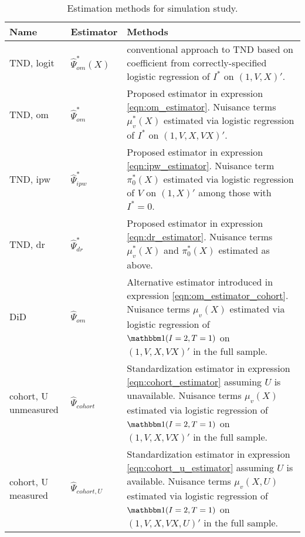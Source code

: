 \begin{appendix}
\begin{table}[p]
    \centering
    \caption{Estimation methods for simulation study.}\label{tab:methods}
    \begin{tabular}{llp{3in}}
        \toprule
        Name & Estimator & Methods \\
        \midrule
        TND, logit & $\widehat{\Psi}_{om}^*(X)$ & conventional approach to TND based on coefficient from correctly-specified logistic regression of $I^*$ on $(1, V, X)'$. \\
        \addlinespace[1em]
        TND, om & $\widehat{\Psi}^*_{om}$ & Proposed estimator in expression \ref{eqn:om_estimator}. Nuisance terms $\mu_v^*(X)$ estimated via logistic regression of $I^*$ on $(1, V, X, VX)'$.  \\
        \addlinespace[1em]
        TND, ipw & $\widehat{\Psi}^*_{ipw}$ & Proposed estimator in expression \ref{eqn:ipw_estimator}. Nuisance term $\pi_0^*(X)$ estimated via logistic regression of $V$ on $(1, X)'$ among those with $I^*=0$. \\
        \addlinespace[1em]
        TND, dr & $\widehat{\Psi}^*_{dr}$ & Proposed estimator in expression \ref{eqn:dr_estimator}. Nuisance terms $\mu_v^*(X)$ and $\pi_0^*(X)$ estimated as above. \\
        \addlinespace[1em]
        DiD & $\widehat{\Psi}_{om}$ &  Alternative estimator introduced in expression \ref{eqn:om_estimator_cohort}. Nuisance terms $\mu_v(X)$ estimated via logistic regression of $\mathbbm 1 (I=2, T=1)$ on $(1, V, X, VX)'$ in the full sample. \\
        \addlinespace[1em]
        cohort, U unmeasured & $\widehat{\Psi}_{cohort}$ & Standardization estimator in expression \ref{eqn:cohort_estimator} assuming $U$ is unavailable. Nuisance terms $\mu_v(X)$ estimated via logistic regression of $\mathbbm 1 (I=2, T=1)$ on $(1, V, X, VX)'$ in the full sample. \\ 
        \addlinespace[1em]
        cohort, U measured & $\widehat{\Psi}_{cohort,U}$ & Standardization estimator in expression \ref{eqn:cohort_u_estimator} assuming $U$ is available. Nuisance terms $\mu_v(X,U)$ estimated via logistic regression of $\mathbbm 1 (I=2, T=1)$ on $(1, V, X, VX, U)'$ in the full sample. \\ 
        \bottomrule
    \end{tabular}
\end{table}
\end{appendix}

